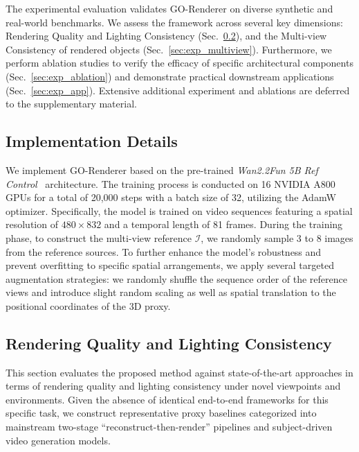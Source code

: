 \documentclass[runningheads]{llncs}
\newcommand{\methodname}{GO-Renderer\xspace}
\begin{document}
The experimental evaluation validates \methodname on diverse synthetic and real-world benchmarks. We assess the framework across several key dimensions: Rendering Quality and Lighting Consistency (Sec.~\ref{sec:exp_quality}), and the Multi-view Consistency of rendered objects (Sec.~\ref{sec:exp_multiview}). Furthermore, we perform ablation studies to verify the efficacy of specific architectural components (Sec.~\ref{sec:exp_ablation}) and demonstrate practical downstream applications (Sec.~\ref{sec:exp_app}). Extensive additional experiment and ablations are deferred to the supplementary material.


\subsection{Implementation Details}
\label{sec:implementation_details}

We implement \methodname based on the pre-trained \textit{Wan2.2Fun 5B Ref Control}~\cite{videoxfun} architecture. The training process is conducted on 16 NVIDIA A800 GPUs for a total of 20,000 steps with a batch size of 32, utilizing the AdamW optimizer. Specifically, the model is trained on video sequences featuring a spatial resolution of $480 \times 832$ and a temporal length of 81 frames. During the training phase, to construct the multi-view reference $\mathcal{I}$, we randomly sample 3 to 8 images from the reference sources. To further enhance the model's robustness and prevent overfitting to specific spatial arrangements, we apply several targeted augmentation strategies: we randomly shuffle the sequence order of the reference views and introduce slight random scaling as well as spatial translation to the positional coordinates of the 3D proxy.

\subsection{Rendering Quality and Lighting Consistency}
\label{sec:exp_quality}

This section evaluates the proposed method against state-of-the-art approaches in terms of rendering quality and lighting consistency under novel viewpoints and environments. Given the absence of identical end-to-end frameworks for this specific task, we construct representative proxy baselines categorized into mainstream two-stage ``reconstruct-then-render'' pipelines and subject-driven video generation models.
\end{document}
